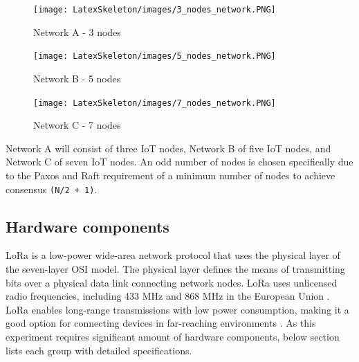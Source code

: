 \documentclass[oneside,12pt]{book}
\begin{document}
\begin{figure}[H]
\centering
\texttt{[image: LatexSkeleton/images/3\_nodes\_network.PNG]}
\caption{Network A - 3 nodes}
\end{figure}

\begin{figure}[H]
\centering
\texttt{[image: LatexSkeleton/images/5\_nodes\_network.PNG]}
\caption{Network B - 5 nodes}
\end{figure}

\begin{figure}[H]
\centering
\texttt{[image: LatexSkeleton/images/7\_nodes\_network.PNG]}
\caption{Network C - 7 nodes}
\end{figure}


\noindent Network A will consist of three IoT nodes, Network B of five IoT nodes, and Network C of seven IoT nodes. An odd number of nodes is chosen specifically due to the Paxos and Raft requirement of a minimum number of nodes to achieve consensus \texttt{(N/2 + 1)}.

\subsection{Hardware components}
LoRa is a low-power wide-area network protocol that uses the physical layer of the seven-layer OSI model. The physical layer defines the means of transmitting bits over a physical data link connecting network nodes. LoRa uses unlicensed radio frequencies, including 433 MHz and 868 MHz in the European Union \citep{sub-GHz}. LoRa enables long-range transmissions with low power consumption, making it a good option for connecting devices in far-reaching environments \citep{CHAUDHARI202015}. As this experiment requires significant amount of hardware components, below section lists each group with detailed specifications.
\end{document}
